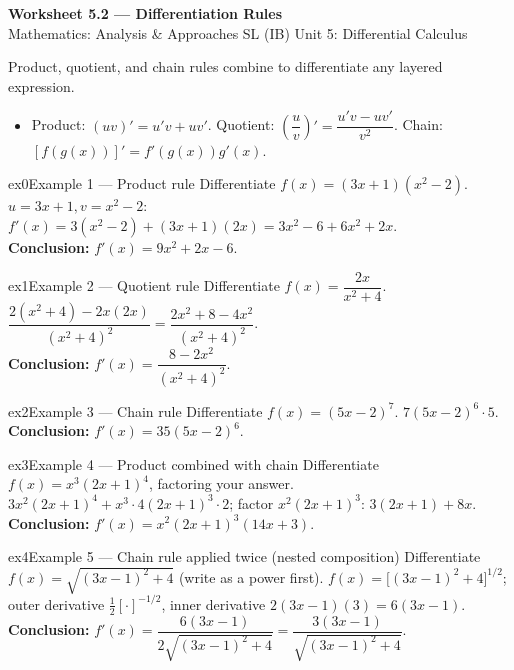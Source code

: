 \documentclass[11pt]{article}
\begin{document}
\begin{center}
{\LARGE\bfseries\color{titleblue}Worksheet 5.2 --- Differentiation Rules}\\[2pt]
{\small Mathematics: Analysis \& Approaches SL (IB) \textperiodcentered{} Unit 5: Differential Calculus}
\end{center}

\begin{ideabox}
Product, quotient, and chain rules combine to differentiate any layered expression.
\begin{itemize}[leftmargin=*,itemsep=2pt]
  \item Product: $(uv)'=u'v+uv'$. Quotient: $\left(\dfrac uv\right)'=\dfrac{u'v-uv'}{v^2}$. Chain: $[f(g(x))]'=f'(g(x))g'(x)$.
\end{itemize}
\end{ideabox}


\begin{example}{ex0}{Example 1 --- Product rule}
Differentiate $f(x)=(3x+1)(x^2-2)$.\soln
$u=3x+1,v=x^2-2$: $f'(x)=3(x^2-2)+(3x+1)(2x)=3x^2-6+6x^2+2x$.\\[3pt]\textbf{Conclusion:} $f'(x)=9x^2+2x-6$.
\end{example}

\begin{example}{ex1}{Example 2 --- Quotient rule}
Differentiate $f(x)=\dfrac{2x}{x^2+4}$.\soln
$\dfrac{2(x^2+4)-2x(2x)}{(x^2+4)^2}=\dfrac{2x^2+8-4x^2}{(x^2+4)^2}$.\\[3pt]\textbf{Conclusion:} $f'(x)=\dfrac{8-2x^2}{(x^2+4)^2}$.
\end{example}

\begin{example}{ex2}{Example 3 --- Chain rule}
Differentiate $f(x)=(5x-2)^7$.\soln
$7(5x-2)^6\cdot5$.\\[3pt]\textbf{Conclusion:} $f'(x)=35(5x-2)^6$.
\end{example}

\begin{example}{ex3}{Example 4 --- Product combined with chain}
Differentiate $f(x)=x^3(2x+1)^4$, factoring your answer.\soln
$3x^2(2x+1)^4+x^3\cdot4(2x+1)^3\cdot2$; factor $x^2(2x+1)^3$: $3(2x+1)+8x$.\\[3pt]\textbf{Conclusion:} $f'(x)=x^2(2x+1)^3(14x+3)$.
\end{example}

\begin{example}{ex4}{Example 5 --- Chain rule applied twice (nested composition)}
Differentiate $f(x)=\sqrt{(3x-1)^2+4}$ (write as a power first).\soln
$f(x)=\big[(3x-1)^2+4\big]^{1/2}$; outer derivative $\tfrac12[\cdot]^{-1/2}$, inner derivative $2(3x-1)(3)=6(3x-1)$.\\[3pt]\textbf{Conclusion:} $f'(x)=\dfrac{6(3x-1)}{2\sqrt{(3x-1)^2+4}}=\dfrac{3(3x-1)}{\sqrt{(3x-1)^2+4}}$.
\end{example}
\end{document}
